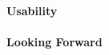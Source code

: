 \documentclass[paper/ddppaper2.tex]{subfiles}
\begin{document}
\paragraph{Usability}\mbox{}
\paragraph{Looking Forward}\mbox{}
\end{document}
